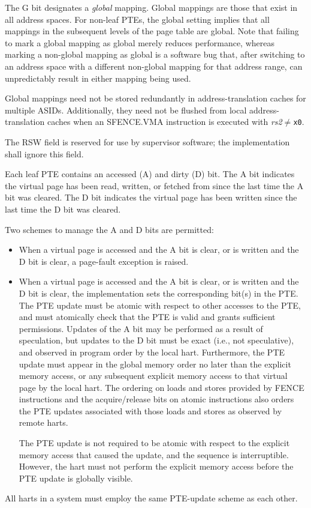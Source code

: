 The G bit designates a {\em global} mapping.  Global mappings are those that
exist in all address spaces.  For non-leaf PTEs, the global setting implies
that all mappings in the subsequent levels of the page table are global.  Note
that failing to mark a global mapping as global merely reduces performance,
whereas marking a non-global mapping as global is a software bug that,
after switching to an address space with a different non-global mapping for
that address range, can unpredictably result in either mapping being used.

\begin{commentary}
Global mappings need not be stored redundantly in address-translation caches
for multiple ASIDs.  Additionally, they need not be flushed from local
address-translation caches when an SFENCE.VMA instruction is executed with
{\em rs2}$\neq${\tt x0}.
\end{commentary}

The RSW field is reserved for use by supervisor software; the implementation
shall ignore this field.

Each leaf PTE contains an accessed (A) and dirty (D) bit.  The A bit indicates
the virtual page has been read, written, or fetched from since the last time
the A bit was cleared.  The D bit indicates the virtual page has been written
since the last time the D bit was cleared.

Two schemes to manage the A and D bits are permitted:
\begin{itemize}
\item When a virtual page is accessed and the A bit is clear, or is
      written and the D bit is clear, a page-fault exception is raised.

\item When a virtual page is accessed and the A bit is clear, or is
      written and the D bit is clear, the implementation sets the
      corresponding bit(s) in the PTE.  The PTE update must be atomic with
      respect to other accesses to the PTE, and must atomically check
      that the PTE is valid and grants sufficient permissions.  Updates
      of the A bit may be performed as a result of speculation, but updates
      to the D bit must be exact (i.e., not speculative), and observed
      in program order by the local hart.  Furthermore, the PTE update
      must appear in the global memory order no later than the explicit
      memory access, or any subsequent explicit memory access to that
      virtual page by the local hart.  The ordering on loads and stores
      provided by FENCE instructions and the acquire/release bits on atomic
      instructions also orders the PTE updates associated with those loads
      and stores as observed by remote harts.

      The PTE update is not required to be atomic with respect to the explicit
      memory access that caused the update, and the sequence is interruptible.
      However, the hart must not perform the explicit memory access before the
      PTE update is globally visible.
\end{itemize}
All harts in a system must employ the same PTE-update scheme as each other.


